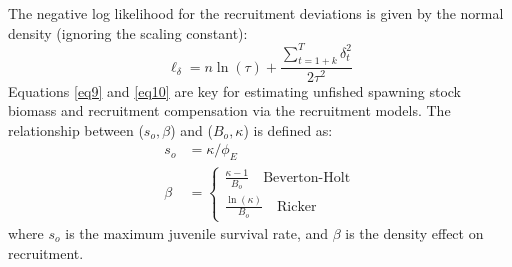 \begin{multicols}{2}
The negative log likelihood for the recruitment deviations is given by the normal density (ignoring the scaling constant):
\begin{equation}\label{eq10}
 \ell_\delta = n\ln(\tau) + \frac{\sum_{t=1+k}^T \delta^2_t}{2\tau^2}
\end{equation}
Equations \eqref{eq9} and \eqref{eq10} are key for estimating unfished spawning stock biomass and recruitment compensation via the recruitment models.  The relationship between ($s_o,\beta$) and ($B_o,\kappa$) is defined as:
\begin{align}
s_o &= \kappa/\phi_E\\
\beta&=\begin{cases}
\frac{\kappa-1}{B_o} \quad \mbox{Beverton-Holt}\\[1ex]
\frac{\ln(\kappa)}{B_o} \quad \mbox{Ricker}
\end{cases}
\end{align}
where $s_o$ is the maximum juvenile survival rate, and $\beta$ is the density effect on recruitment.



\end{multicols}
